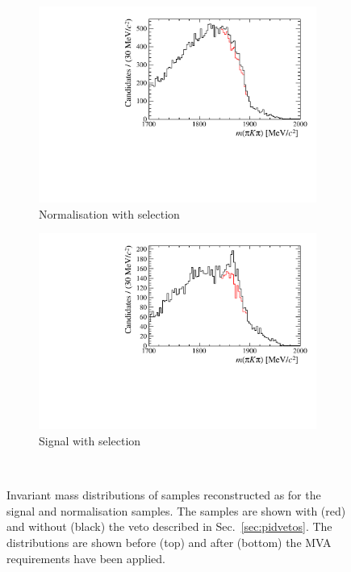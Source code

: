 \begin{figure}[!h]
\begin{subfigure}[t]{0.4\textwidth}
        \includegraphics[width=1.0\textwidth]{figs/Selection/B2DsD0_Ds2KKPi_D_Veto_WithBDT.pdf}
        \caption{Normalisation with selection}
    \end{subfigure}%
    \begin{subfigure}[t]{0.4\textwidth}
        \includegraphics[width=1.0\textwidth]{figs/Selection/B2DsPhi_Ds2KKPi_D_Veto_WithBDT.pdf}
        \caption{Signal with selection}
    \end{subfigure}\\
    \caption{Invariant mass distributions of \decay{\Dsp}{\Kp\Km\pip} samples reconstructed as \decay{\Dp}{\pip\Km\pip} for the signal and normalisation samples. The samples are shown with (red) and without (black) the veto described in Sec.~\ref{sec:pidvetos}. The distributions are shown before (top) and after (bottom) the MVA requirements have been applied.}
    \label{fig:PIDVetos_Ds2KKPi_D_Veto}   
\end{figure}

